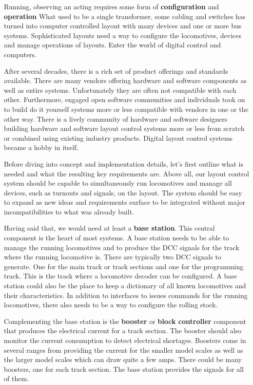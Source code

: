 Running, observing an acting requires some form of {\bf configuration} and {\bf operation} What used to be a single transformer, some cabling and switches has turned into computer controlled layout with many devices and one or more bus systems. Sophisticated layouts need a way to configure the locomotives, devices and manage operations of layouts. Enter the world of digital control and computers.

After several decades, there is a rich set of product offerings and standards available. There are many vendors offering hardware and software components as well as entire systems. Unfortunately they are often not compatible with each other. Furthermore, engaged open software communities and individuals took on to build do it yourself systems more or less compatible with vendors in one or the other way. There is a lively community of hardware and software designers building hardware and software layout control systems more or less from scratch or combined using existing industry products. Digital layout control systems became a hobby in itself.


Before diving into concept and implementation details, let's first outline what is needed and what the resulting key requirements are. Above all, our layout control system should be capable to simultaneously run locomotives and manage all devices, such as turnouts and signals, on the layout. The system should be easy to expand as new ideas and requirements surface to be integrated without major incompatibilities to what was already built.

Having said that, we would need at least a {\bf base station}. This central component is the heart of most systems. A base station needs to be able to manage the running locomotives and to produce the DCC signals for the track where the running locomotive is. There are typically two DCC signals to generate. One for the main track or track sections and one for the programming track. This is the track where a locomotive decoder can be configured. A base station could also be the place to keep a dictionary of all known locomotives and their characteristics. In addition to interfaces to issues commands for the running locomotives, there also needs to be a way to configure the rolling stock.

Complementing the base station is the {\bf booster} or {\bf block controller} component that produces the electrical current for a track section. The booster should also monitor the current consumption to detect electrical shortages. Boosters come in several ranges from providing the current for the smaller model scales as well as the larger model scales which can draw quite a few amps. There could be many boosters, one for each track section. The base station provides the signals for all of them.

